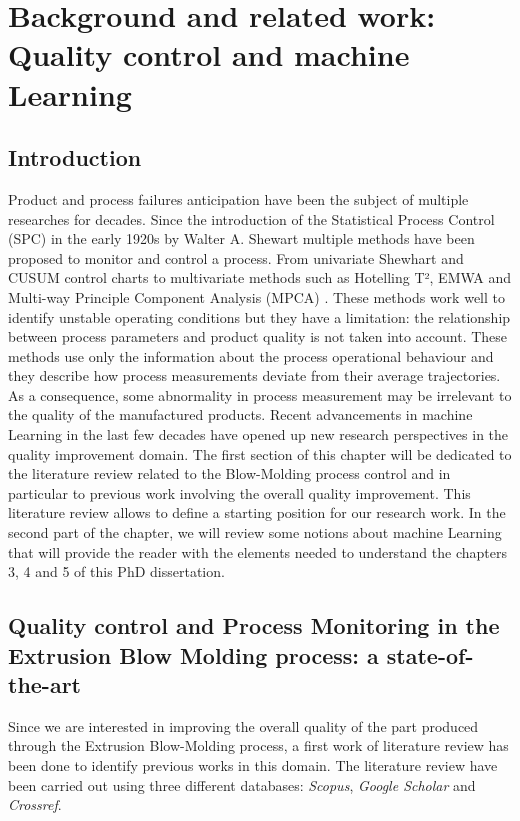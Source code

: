 \chapter{Background and related work: Quality control and machine Learning} \label{Background and related work: Quality control and machine Learning}
\minitoc

\section{Introduction}

Product and process failures anticipation have been the subject of multiple researches for decades. Since the introduction of the Statistical Process Control (SPC) in the early 1920s by Walter A. Shewart multiple methods have been proposed to monitor and control a process. From univariate Shewhart and  CUSUM \citep{woodall1985multivariate} \citep{crosier1988multivariate} control charts to multivariate methods such as Hotelling T², EMWA \citep{lowry1992multivariate} and Multi-way Principle Component Analysis (MPCA) \citep{nomikos1994monitoring}. These methods work well to identify unstable operating conditions but they have a limitation: the relationship between process parameters and product quality is not taken into account. These methods use only the information about the process operational behaviour and they describe how process measurements deviate from their average trajectories. As a consequence, some abnormality in process measurement may be irrelevant to the quality of the manufactured products. Recent advancements in machine Learning in the last few decades have opened up new research perspectives in the quality improvement domain. The first section of this chapter will be dedicated to the literature review related to the Blow-Molding process control and in particular to previous work involving the overall quality improvement. This literature review allows to define a starting position for our research work. In the second part of the chapter, we will review some notions about machine Learning that will provide the reader with the elements needed to understand the chapters 3, 4 and 5 of this PhD dissertation. 

\section{Quality control and Process Monitoring in the Extrusion Blow Molding process: a state-of-the-art} \label{}

Since we are interested in improving the overall quality of the part produced through the Extrusion Blow-Molding process, a first work of literature review has been done to identify previous works in this domain. The literature review have been carried out using three different databases: \textit{Scopus}, \textit{Google Scholar} and \textit{Crossref}.


